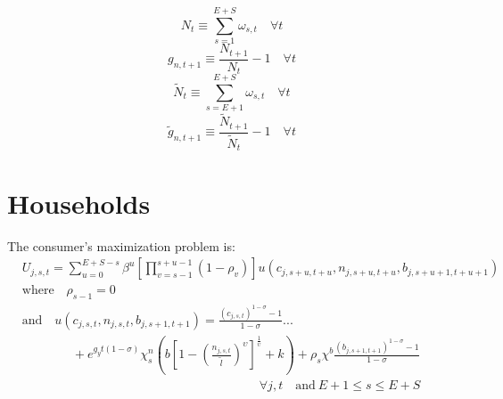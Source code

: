    \begin{equation}\label{EqPopDef}
      N_t\equiv\sum_{s=1}^{E+S} \omega_{s,t} \quad\forall t
    \end{equation}
    \begin{equation}\label{EqPopGrowth}
      g_{n,t+1} \equiv \frac{N_{t+1}}{N_t} - 1 \quad\forall t
    \end{equation}
    \begin{equation}\label{EqPopWkDef}
      \tilde{N}_t\equiv\sum_{s=E+1}^{E+S} \omega_{s,t} \quad\forall t
    \end{equation}
    \begin{equation}\label{EqPopWkGrowth}
      \tilde{g}_{n,t+1} \equiv \frac{\tilde{N}_{t+1}}{\tilde{N}_t} - 1 \quad\forall t
    \end{equation}


  \section{Households}
    The consumer's maximization problem is:
    \begin{equation}\label{EqUtilMax}
      \begin{split}
        &U_{j,s,t} = \sum_{u=0}^{E+S-s}\beta^u\left[\prod_{v=s-1}^{s+u-1}(1-\rho_v)\right] u\left(c_{j,s+u,t+u},n_{j,s+u,t+u},b_{j,s+u+1,t+u+1}\right) \\
        &\text{where}\quad \rho_{s-1}=0 \\
        &\text{and} \quad u\left(c_{j,s,t},n_{j,s,t},b_{j,s+1,t+1}\right) = \frac{\left(c_{j,s,t}\right)^{1-\sigma} - 1}{1-\sigma} ... \\
        &\qquad\qquad + e^{g_y t(1-\sigma)}\chi^n_s\left(b\left[1 - \left(\frac{n_{j,s,t}}{\tilde{l}}\right)^\upsilon\right]^\frac{1}{\upsilon} + k\right) + \rho_s\chi^b\frac{\left(b_{j,s+1,t+1}\right)^{1-\sigma} - 1}{1-\sigma} \\
        &\quad\quad\quad\quad\quad\quad\quad\quad\quad\quad\quad\quad\quad\quad\quad\quad\quad\quad\quad\forall j,t\quad\text{and}\:E+1\leq s\leq E+S
      \end{split}
    \end{equation}


